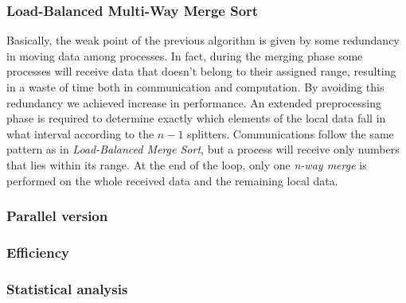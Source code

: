 \subsubsection{Load-Balanced Multi-Way Merge Sort}
Basically, the weak point of the previous algorithm is given by some redundancy in moving data among processes. In fact, during the merging phase some processes will receive data that doesn't belong to their assigned range, resulting in a waste of time both in communication and computation. By avoiding this redundancy we achieved increase in performance. An extended preprocessing phase is required to determine exactly which elements of the local data fall in what interval according to the $n-1$ splitters. Communications follow the same pattern as in \textit{Load-Balanced Merge Sort}, but a process will receive only numbers that lies within its range. At the end of the loop, only one \textit{n-way merge} is performed on the whole received data and the remaining local data.



\subsubsection*{Parallel version}
\subsubsection*{Efficiency} 
\subsubsection*{Statistical analysis}
